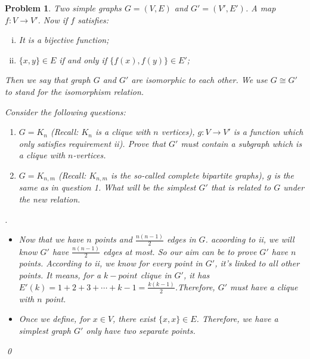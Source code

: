 \documentclass[12pt]{article}
\newtheorem{hw}{Problem}
\newenvironment{sol}
  {\par\vspace{3mm}\noindent{\it Solution}.}
  {\qed}
\begin{document}
\begin{hw}

\noindent Two simple graphs $G=(V,E)$ and $G'=(V',E')$. A map $f: V\rightarrow V'$. Now if $f$ satisfies:
\begin{enumerate}[i)]
  \item It is a bijective function;
  \item $\{x,y\}\in E$ if and only if $\{f(x), f(y)\}\in E'$;
\end{enumerate}
Then we say that graph $G$ and $G'$ are \emph{isomorphic} to each other. We use  $G\cong G'$ to stand for the isomorphism relation.

Consider the following questions:
\begin{enumerate}
  \item $G=K_n$ (Recall: $K_n$ is a clique with $n$ vertices), $g: V\rightarrow V'$ is a function which only satisfies requirement ii). Prove that $G'$ must contain a subgraph which is a clique with $n$-vertices.
  \item $G=K_{n,m}$ (Recall: $K_{n,m}$ is the so-called \emph{complete bipartite graphs}), $g$ is the same as in question 1.  What will be the simplest $G'$ that is related to $G$ under the new relation.
\end{enumerate}

\begin{sol}
\renewcommand{\qedsymbol}{}
    \begin{itemize}
    	\item [(1)] Now that we have $n$ points and $\frac{n(n-1)}{2}$ edges in $G$. acoording to ii, we will know $G'$ have $\frac{n(n-1)}{2}$ edges at most. So our aim can be to prove $G'$ have $n$ points. According to ii, we know for every point in $G'$, it's linked to all other points. It means, for a $k-point$ clique in $G'$, it has $E'(k)=1+2+3+\cdots+k-1=\frac{k(k-1)}{2}$.Therefore, $G'$ must have a clique with $n$ point.
    	\item [(2)] Once we define, for $x \in V$, there exist $\{x, x\} \in E$. Therefore, we have a simplest graph $G'$ only have two separate points.
    	
    \end{itemize}
\end{sol}
\end{hw}
\end{document}
